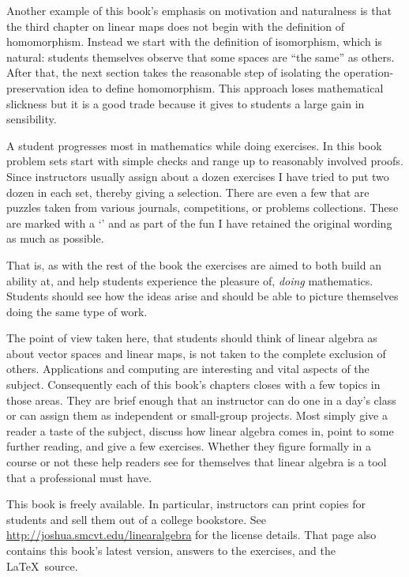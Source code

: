 Another example of this book's emphasis on motivation and naturalness
is that the third chapter on linear maps
does not begin with the definition of homomorphism.
Instead we start with the definition of isomorphism, which
is natural: students themselves
observe that some spaces are ``the same'' as others.
After that,
the next section takes the reasonable step of 
isolating the operation-preservation idea
to define homomorphism.
This approach loses mathematical slickness 
but it is a good trade because it gives to students
a large gain in sensibility.

A student progresses most in mathematics while doing exercises. 
In this book problem sets start with 
simple checks and range up to reasonably involved proofs.
Since instructors usually assign about a dozen exercises
I have tried to put two dozen in each set, 
thereby giving a selection.
There are even a few that are puzzles
taken from various journals, competitions, or
problems collections. 
These are marked with a
`\puzzlemark' and 
as part of the fun I have retained the original wording
as much as possible.

That is, as with the rest of the book 
the exercises are aimed to both build an ability at,
and help students experience the pleasure of, 
\emph{doing} mathematics.
Students should see how the ideas arise and should be able to 
picture themselves doing the same type of work.


\medskip
{}
The point of view taken here, that students should think of 
linear algebra as about vector spaces
and linear maps, is not taken to the complete exclusion of others.
Applications and computing are interesting and vital aspects 
of the subject.
Consequently each of this book's chapters closes with a few 
topics in those areas.
They are brief enough that an instructor can do one
in a day's class 
or can assign them as independent or small-group projects.
Most simply give a reader
a taste of the subject, discuss how linear algebra comes in,
point to some further reading, and give a few exercises. 
Whether they figure formally in a course or not these help
readers see for themselves that linear algebra is a tool
that a professional must have. 




\medskip
{}
This book is freely available.
In particular, instructors can print copies for students 
and sell them out of a college bookstore.
See 
\url{http://joshua.smcvt.edu/linearalgebra}
for the license details.
That page also contains this book's latest version,
answers to the exercises, and the \LaTeX\ source.

